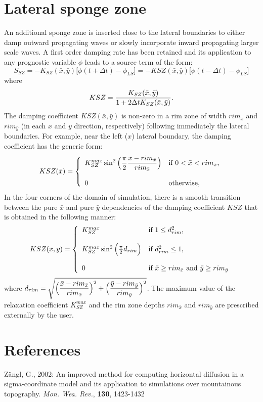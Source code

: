 \section{Lateral sponge zone}
An additional sponge zone is inserted close to the lateral boundaries to either
damp outward propagating waves or slowly incorporate inward propagating
larger scale waves. A first order damping rate has been retained and its
application to any prognostic variable $\phi$ leads to a source term of the
form:
$$
S_{SZ}=-K_{SZ} (\bar x, \bar y)\big[\phi(t+\Delta t)- \phi_{LS} \big]
      =-KSZ(\bar x, \bar y) \big[\phi(t-\Delta t)- \phi_{LS} \big]$$
where
$$ KSZ= {K_{SZ}(\bar x, \bar y) \over 1+2 \Delta t K_{SZ}(\bar x, \bar y)}.$$
The damping coefficient $KSZ(\bar x, \bar y)$ is non-zero in a rim zone of
width ${rim}_{\bar x}$ and ${rim}_{\bar y}$ (in each $x$ and $y$ direction,
respectively) following immediately the lateral boundaries. For example, near
the left ($x$) lateral boundary, the damping coefficient has the generic form:
$$
KSZ(\bar x) = \left\{ \begin{array}{ll}
K_{SZ}^{max} \sin^2 \Big(\displaystyle{{\pi \over 2}{\bar x-{rim}_{\bar x} \over {rim}_{\bar x}}} \Big)
            & \mbox{if $0 < \bar x < {rim}_{\bar x}$,} \\
 \\
 0          & \mbox{otherwise,}
                   \end{array}
        \right.
$$
In the four corners of the domain of simulation, there is a smooth transition
between the pure $\bar x$ and pure $\bar y$ dependencies of the damping
coefficient $KSZ$ that is obtained in the following manner:
$$
KSZ(\bar x, \bar y) = \left\{ \begin{array}{ll}
K_{SZ}^{max}& \mbox{if $1 \le d_{rim}^2$,} \\
 \\
K_{SZ}^{max} \sin^2 \Big({\pi \over 2} d_{rim} \Big)
            & \mbox{if $d_{rim}^2 \le 1$,} \\
 \\
 0          & \mbox{if $\bar x \ge {rim}_{\bar x}$ and $\bar y \ge {rim}_{\bar y}$} \\
                         \end{array}
        \right.
$$
where
$d_{rim}= \sqrt{\Big( \displaystyle{{\bar x-{rim}_{\bar x} \over {rim}_{\bar x}}\Big)^2 +
                \Big( {\bar y-{rim}_{\bar y} \over {rim}_{\bar y}}\Big)^2 }}$.
The maximum value of the relaxation coefficient $K_{SZ}^{max}$ and the rim zone
depths ${rim}_{\bar x}$ and ${rim}_{\bar y}$ are prescribed externally by the
user.

\section{References}
\decrefname
Z\"angl, G., 2002:  An improved method for computing horizontal diffusion
in a sigma-coordinate model and its application to simulations over
mountainous topography. {\it Mon. Wea. Rev.}, {\bf 130}, 1423-1432 